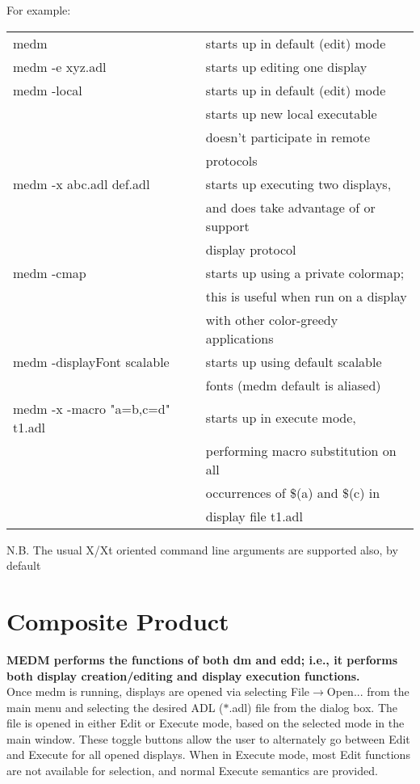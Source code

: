 \vspace{12pt}
\noindent For example:\\

\begin{tabular}{ll}
medm			& starts up in default (edit) mode\\
medm -e xyz.adl		& starts up editing one display \\
medm -local		& starts up in default (edit) mode\\
			& starts up new local executable\\
			& doesn't participate in remote\\
			& protocols\\
medm -x abc.adl def.adl	& starts up executing two displays,\\
			& and does take advantage of or support\\
			& display protocol\\
medm -cmap		& starts up using a private colormap;\\
			& this is useful when run on a display\\
			& with other color-greedy applications\\
medm -displayFont scalable & starts up using default scalable\\
			& fonts (medm default is aliased)\\
medm -x -macro "a=b,c=d" t1.adl & starts up in execute mode,\\
			& performing macro substitution on all\\
			& occurrences of \$(a) and \$(c) in\\
			& display file t1.adl\\
 
\end{tabular}

\vspace{12pt}
\noindent N.B. The usual X/Xt oriented command line arguments are supported
also, by default


\section{Composite Product}

{\bf MEDM performs the functions of both dm and edd; i.e., it performs
both display creation/editing and display execution functions.}\\

\noindent Once medm is running, displays are opened via selecting
File$\rightarrow$Open...  from the main menu and selecting the desired ADL
($*$.adl) file from
the dialog box.  The file is opened in either Edit or Execute mode, based on
the selected mode in the main window.  These toggle buttons allow the user
to alternately go between Edit and Execute for all opened displays.
When in Execute mode, most Edit functions are not available for selection,
and normal Execute semantics are provided.

